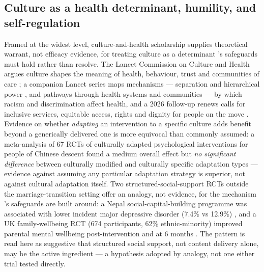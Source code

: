 \subsection{Culture as a health determinant, humility, and self-regulation}
Framed at the widest level, culture-and-health scholarship supplies theoretical warrant, not efficacy evidence, for treating culture as a determinant \tphe{}'s safeguards must hold rather than resolve. The Lancet Commission on Culture and Health argues culture shapes the meaning of health, behaviour, trust and communities of care \cite{ref85}; a companion Lancet series maps mechanisms --- separation and hierarchical power \cite{ref86}, and pathways through health systems and communities \cite{ref87} --- by which racism and discrimination affect health, and a 2026 follow-up renews calls for inclusive services, equitable access, rights and dignity for people on the move \cite{ref88}. Evidence on whether \emph{adapting} an intervention to a specific culture adds benefit beyond a generically delivered one is more equivocal than commonly assumed: a meta-analysis of 67 RCTs of culturally adapted psychological interventions for people of Chinese descent found a medium overall effect but \emph{no significant difference} between culturally modified and culturally specific adaptation types \cite{ref89} --- evidence against assuming any particular adaptation strategy is superior, not against cultural adaptation itself. Two structured-social-support RCTs outside the marriage-transition setting offer an analogy, not evidence, for the mechanism \tphe{}'s safeguards are built around: a Nepal social-capital-building programme was associated with lower incident major depressive disorder (7.4\% vs 12.9\%) \cite{ref90}, and a UK family-wellbeing RCT (674 participants, 62\% ethnic-minority) improved parental mental wellbeing post-intervention and at 6 months \cite{ref91}. The pattern is read here as suggestive that structured social support, not content delivery alone, may be the active ingredient --- a hypothesis adopted by analogy, not one either trial tested directly.

